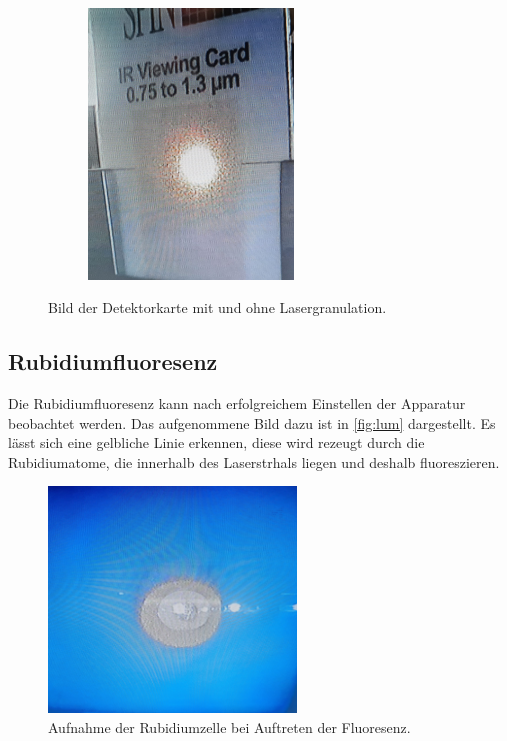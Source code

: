 \begin{figure}
\begin{subfigure}[c]{0.5\textwidth}
    \end{subfigure}
    \hfill
    \begin{subfigure}[c]{0.5\textwidth}
        \centering
        \includegraphics[width=0.6\textwidth]{content/pics/3.jpg}
    \end{subfigure}

    \caption{Bild der Detektorkarte mit und ohne Lasergranulation.}
    \label{fig:granulation}
\end{figure}

\subsection{Rubidiumfluoresenz}
\label{sec:rubidium}
Die Rubidiumfluoresenz kann nach erfolgreichem Einstellen der Apparatur beobachtet werden. Das aufgenommene Bild
dazu ist in \autoref{fig:lum} dargestellt.
Es lässt sich eine gelbliche Linie erkennen, diese wird rezeugt durch die Rubidiumatome, die innerhalb des
Laserstrhals liegen und deshalb fluoreszieren.
\begin{figure}
    \centering
    \includegraphics[height=6cm]{content/pics/4.jpg}
    \caption{Aufnahme der Rubidiumzelle bei Auftreten der Fluoresenz.}
    \label{fig:lum}
\end{figure}

